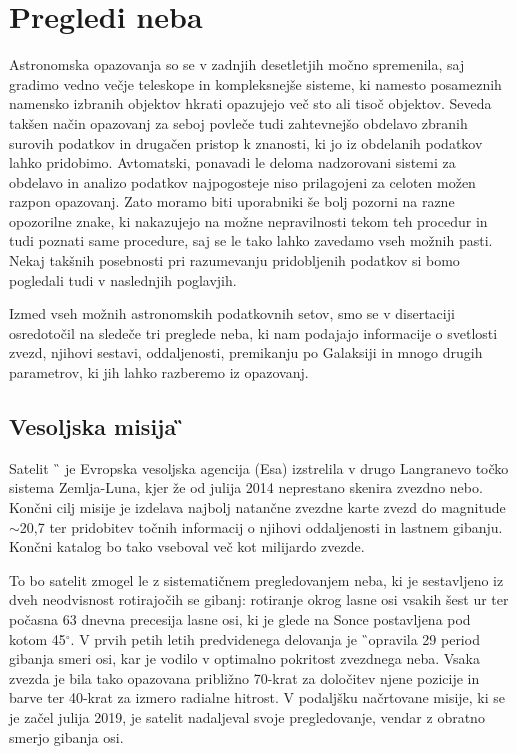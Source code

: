 \section{Pregledi neba}
\label{sec:slo_pregledi}
Astronomska opazovanja so se v zadnjih desetletjih močno spremenila, saj gradimo vedno večje teleskope in kompleksnejše sisteme, ki namesto posameznih namensko izbranih objektov hkrati opazujejo več sto ali tisoč objektov. Seveda takšen način opazovanj za seboj povleče tudi zahtevnejšo obdelavo zbranih surovih podatkov in drugačen pristop k znanosti, ki jo iz obdelanih podatkov lahko pridobimo. Avtomatski, ponavadi le deloma nadzorovani sistemi za obdelavo in analizo podatkov najpogosteje niso prilagojeni za celoten možen razpon opazovanj. Zato moramo biti uporabniki še bolj pozorni na razne opozorilne znake, ki nakazujejo na možne nepravilnosti tekom teh procedur in tudi poznati same procedure, saj se le tako lahko zavedamo vseh možnih pasti. Nekaj takšnih posebnosti pri razumevanju pridobljenih podatkov si bomo pogledali tudi v naslednjih poglavjih.

Izmed vseh možnih astronomskih podatkovnih setov, smo se v disertaciji osredotočil na sledeče tri preglede neba, ki nam podajajo informacije o svetlosti zvezd, njihovi sestavi, oddaljenosti, premikanju po Galaksiji in mnogo drugih parametrov, ki jih lahko razberemo iz opazovanj.

\subsection{Vesoljska misija \G}
\label{sec:slo_gaia}
Satelit \G\ \cite{2016A&A...595A...1G} je Evropska vesoljska agencija (Esa) izstrelila v drugo Langranevo točko sistema Zemlja-Luna, kjer že od julija 2014 neprestano skenira zvezdno nebo. Končni cilj misije je izdelava najbolj natančne zvezdne karte zvezd do magnitude $\sim$20,7 ter pridobitev točnih informacij o njihovi oddaljenosti in lastnem gibanju. Končni katalog bo tako vseboval več kot milijardo zvezde.

To bo satelit zmogel le z sistematičnem pregledovanjem neba, ki je sestavljeno iz dveh neodvisnost rotirajočih se gibanj: rotiranje okrog lasne osi vsakih šest ur ter počasna 63 dnevna precesija lasne osi, ki je glede na Sonce postavljena pod kotom 45$^\circ$. V prvih petih letih predvidenega delovanja je \G\ opravila 29 period gibanja smeri osi, kar je vodilo v optimalno pokritost zvezdnega neba. Vsaka zvezda je bila tako opazovana približno 70-krat za določitev njene pozicije in barve ter 40-krat za izmero radialne hitrost. V podaljšku načrtovane misije, ki se je začel julija 2019, je satelit nadaljeval svoje pregledovanje, vendar z obratno smerjo gibanja osi.

